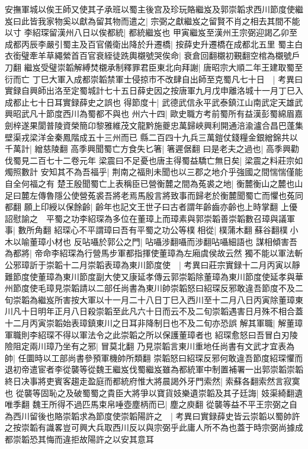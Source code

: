 安撫軍城以俟王師又使其子承班以蜀主後宫及珍玩賂繼岌及郭崇韜求西川節度使繼岌曰此皆我家物奚以獻為留其物而遣之|{
	宗弼之獻繼岌之留賢不肖之相去其間不能以寸}
李紹琛留漢州八日以俟都統|{
	都統繼岌也}
甲寅繼岌至漢州王宗弼迎謁乙卯至成都丙辰李嚴引蜀主及百官儀衛出降於升遷橋|{
	按薛史升遷橋在成都北五里}
蜀主白衣銜璧牽羊草繩縈首百官衰絰徒跣輿櫬號哭俟命|{
	衰倉回翻櫬初覲翻空棺為櫬號戶刀翻}
繼岌受璧崇韜解縛焚櫬承制釋罪君臣東北向拜謝|{
	唐昭宗大順二年王建取蜀至衍而亡}
丁巳大軍入成都崇韜禁軍士侵掠市不改肆自出師至克蜀凡七十日　|{
	考異曰實録自興師出洛至定蜀城計七十五日薛史因之按唐軍九月戊申離洛城十一月丁巳入成都止七十日耳實録薛史之誤也}
得節度十|{
	武德武信永平武泰鎮江山南武定天雄武興昭武凡十節度西川為蜀都不與也}
州六十四|{
	歐史職方考前蜀所有益漢彭蜀綿眉嘉劍梓遂果閬普陵資榮簡卬黎雅維茂文龍黔施夔忠萬歸峽興利開通涪渝瀘合昌巴蓬集壁渠戎梁洋金秦鳳階成五十三州而已}
縣二百四十九兵三萬鎧仗錢糧金銀繒錦共以千萬計|{
	繒慈陵翻}
高季興聞蜀亡方食失匕箸|{
	箸遲倨翻}
曰是老夫之過也|{
	高季興勸伐蜀見二百七十二卷元年}
梁震曰不足憂也唐主得蜀益驕亡無日矣|{
	梁震之料莊宗如燭照數計}
安知其不為吾福乎|{
	荆南之福則未聞也以三郡之地介乎強國之間惴惴僅能自全何福之有}
楚王殷聞蜀亡上表稱臣已營衡麓之間為菟裘之地|{
	衡麓衡山之麓也山足曰麓左傳魯隱公使營菟裘吾將老焉馬殷言將致事而歸老於衡麓聞蜀亡而懼也菟同都翻}
願上印綬以保餘齡|{
	齡年也記文王世子曰古者謂年齡齒亦齡也上時掌翻}
上優詔慰諭之　平蜀之功李紹琛為多位在董璋上而璋素與郭崇韜善崇韜數召璋與議軍事|{
	數所角翻}
紹琛心不平謂璋曰吾有平蜀之功公等樸相從|{
	樸蒲木翻蘇谷翻樸小木以喻董璋小材也}
反呫囁於郭公之門|{
	呫囁涉翻囁而涉翻呫囁細語也}
謀相傾害吾為都將|{
	帝命李紹琛為行營馬步軍都指揮使董璋為左廂虞侯故云然}
獨不能以軍法斬公邪璋訢于崇韜十二月崇韜表璋為東川節度使　|{
	考異曰莊宗實録十二月丙寅以靜難節度使董璋為東川節度副大使又康延孝傳云郭崇韜除董璋為東川節度使延孝與華州節度使毛璋見崇韜請以二部任尚書為東川帥崇韜怒曰紹琛反邪敢違吾節度不及二旬崇韜為繼岌所害按大軍以十一月二十八日丁巳入西川至十二月八日丙寅除董璋東川凡十日明年正月八日殺崇韜至此凡六十日而云不及二旬崇韜遇害日月殊不相合蓋十二月丙寅崇韜始表璋鎮東川之日耳非降制日也不及二旬亦恐誤}
解其軍職|{
	解董璋軍職則李紹琛不得以軍法令之此崇韜之所以保護董璋者也}
紹琛愈怒曰吾冒白刃陵險阻定兩川璋乃坐有之邪|{
	冒莫北翻}
乃見崇韜言東川重地任尚書有文武才宜表為帥|{
	任圜時以工部尚書參預軍機帥所類翻}
崇韜怒曰紹琛反邪何敢違吾節度紹琛懼而退初帝遣宦者李從襲等從魏王繼岌伐蜀繼岌雖為都統軍中制置補署一出郭崇韜崇韜終日决事將吏賓客趨走盈庭而都統府惟大將晨謁外牙門索然|{
	索蘇各翻索然言寂寞也}
從襲等固恥之及破蜀蜀之貴臣大將爭以寶貨妓樂遺崇韜及其子廷誨|{
	妓渠綺翻遺唯季翻}
魏王所得不過匹馬束帛唾壺塵柄而已|{
	塵之庾翻}
從襲等益不平王宗弼之自為西川留後也賂崇韜求為節度使崇韜陽許之　|{
	考異曰實録薛史皆云崇韜以蜀帥許之按崇韜有識畧豈可興大兵取西川反以與宗弼乎此庸人所不為也蓋于時宗弼尚據成都崇韜恐其悔而違拒故陽許之以安其意耳}

